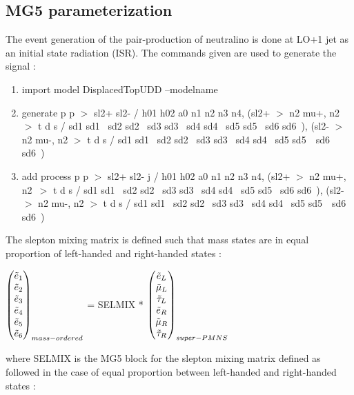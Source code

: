 \documentclass{cernatlasnote}
\begin{document}
\begin{appendices}
\subsection{MG5 parameterization}
The event generation of the pair-production of neutralino is done at LO+1 jet as an initial state radiation (ISR).
The commands given are used to generate the signal : 
\begin{enumerate}
    \item import model DisplacedTopUDD --modelname
    \item generate p p  $>$ sl2+ sl2- / h01 h02 a0 n1 n2 n3 n4, (sl2+ $>$ n2 mu+, n2\
 $>$ t d s / sd1 sd1~ sd2 sd2~ sd3 sd3~ sd4 sd4~ sd5 sd5~ sd6 sd6~), (sl2- $>$ n2 mu-, n2 $>$ t d s / sd1 sd1~ sd2 sd2~ sd3 sd3~ sd4 sd4~ sd5 sd5~\
 sd6 sd6~)  
    \item add process p p  $>$ sl2+ sl2- j / h01 h02 a0 n1 n2 n3 n4, (sl2+ $>$ n2 mu+, n2\
 $>$ t d s / sd1 sd1~ sd2 sd2~ sd3 sd3~ sd4 sd4~ sd5 sd5~ sd6 sd6~), (sl2- $>$ n2 mu-, n2 $>$ t d s / sd1 sd1~ sd2 sd2~ sd3 sd3~ sd4 sd4~ sd5 sd5~\
 sd6 sd6~) 
\end{enumerate}

  The slepton mixing matrix is defined such that mass states are in equal proportion of left-handed and right-handed states :
\begin{center}
 $\begin{pmatrix}
  \Tilde{e}_{1} \\ 
  \Tilde{e}_{2}  \\
  \Tilde{e}_{3} \\
  \Tilde{e}_{4} \\
  \Tilde{e}_{5}  \\
  \Tilde{e}_{6} \\
\end{pmatrix}_{mass-ordered}$ = SELMIX *  $\begin{pmatrix}
  \Tilde{e}_{L} \\ 
  \Tilde{\mu}_{L}  \\
  \Tilde{\tau}_{L} \\
  \Tilde{e}_{R} \\
  \Tilde{\mu}_{R}  \\
  \Tilde{\tau}_{R} \\
\end{pmatrix}_{super-PMNS}$
\end{center}
where SELMIX is the MG5 block for the slepton mixing matrix \cite{Allanach_2009} defined as followed in the case of equal proportion between left-handed and right-handed states :


\end{appendices}
\end{document}
